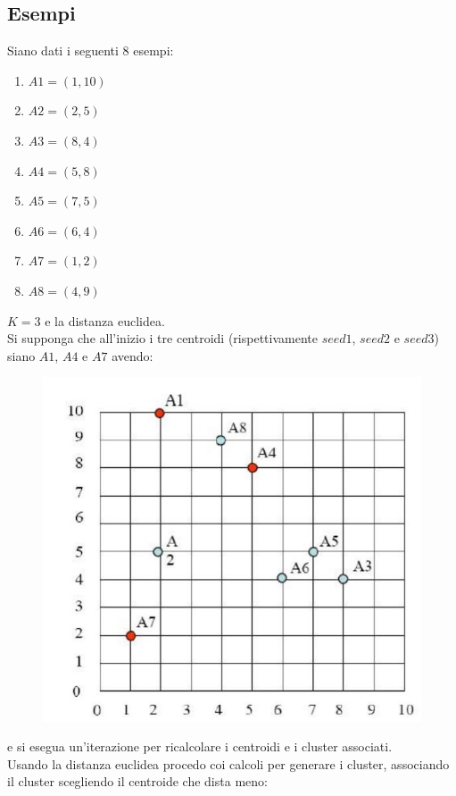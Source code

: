 \subsection{Esempi}
\begin{esempio}
  Siano dati i seguenti 8 esempi:
  \begin{enumerate}
    \item $A1=(1, 10)$
    \item $A2=(2, 5)$
    \item $A3=(8, 4)$
    \item $A4=(5, 8)$
    \item $A5=(7, 5)$
    \item $A6=(6, 4)$
    \item $A7=(1, 2)$
    \item $A8=(4, 9)$
  \end{enumerate}
  $K=3$ e la distanza euclidea.\\
  Si supponga che all'inizio i tre centroidi (rispettivamente $seed1$, $seed2$ e
  $seed$3) siano $A1$, $A4$ e $A7$ avendo: 
  \begin{figure}[H]
    \centering
    \includegraphics[scale = 0.4]{img/clue.jpg}
  \end{figure}
  \noindent
  e si esegua un'iterazione per ricalcolare i centroidi e i cluster associati.\\
  Usando la distanza euclidea procedo coi calcoli per generare i cluster,
  associando il cluster scegliendo il centroide che dista meno:

\end{esempio}
